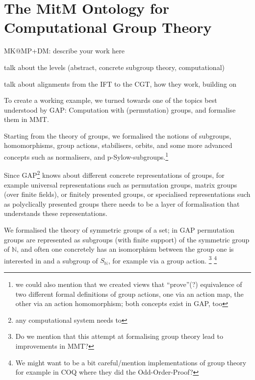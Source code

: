 \section{The MitM Ontology for Computational Group Theory}\label{sec:cgt}
\begin{todolist}{MK@MP+DM: describe your work here}
\item talk about the levels (abstract, concrete subgroup theory, computational)
\item talk about alignments from the IFT to the CGT, how they work, building
  on~\cite{MueRoYuRa:abtafs17,MueGauKal:cacfms17} 
\end{todolist}

To create a working example, we turned towards one of the topics best
understood by GAP: Computation with (permutation) groups, and formalise them in
MMT.

Starting from the theory of groups, we formalised the notions of
subgroups, homomorphisms, group actions, stabilisers, orbits, and some more
advanced concepts such as normalisers, and p-Sylow-subgroups.\footnote{we could
  also mention that we created views that ``prove''(?) equivalence of two
  different formal definitions of group actions, one via an action map, the
  other via an action homomorphism; both concepts exist in GAP, too }

Since GAP\footnote{any computational system needs to} knows about different
concrete representations of groups, for example universal representations such
as permutation groups, matrix groups (over finite fields), or finitely presented
groups, or specialised representations such as polyclically presented groups
there needs to be a layer of formalisation that
understands these representations.

We formalised the theory of symmetric groups of a set; in GAP permutation groups
are represented as subgroups (with finite support) of the symmetric group of
$\mathbb{N}$, and often one concretely has an isomorphism between the group one
is interested in and a subgroup of $S_{\mathbb{N}}$, for example
via a group action.
\footnote{Do we mention that this attempt at formalising group theory lead to
  improvements in MMT?}
\footnote{We might want to be a bit careful/mention implementations of group
  theory for example in COQ where they did the Odd-Order-Proof?}


